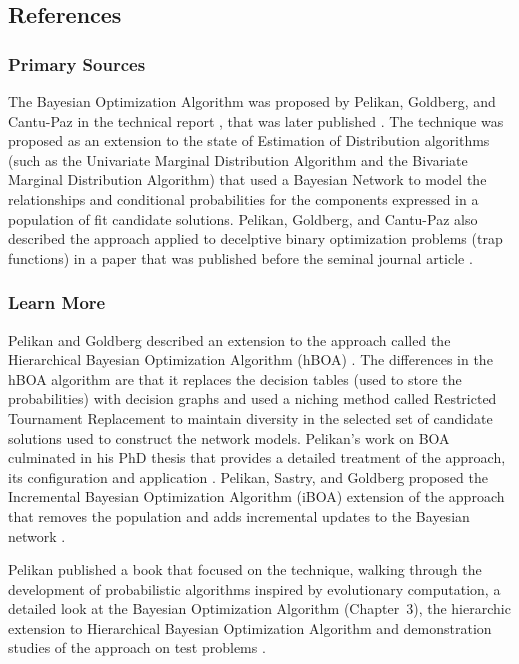 \subsection{References}

% 
% 
\subsubsection{Primary Sources}
The Bayesian Optimization Algorithm was proposed by Pelikan, Goldberg, and Cantu-Paz in the technical report \cite{Pelikan1998a}, that was later published \cite{Pelikan2002}. The technique was proposed as an extension to the state of Estimation of Distribution algorithms (such as the Univariate Marginal Distribution Algorithm and the Bivariate Marginal Distribution Algorithm) that used a Bayesian Network to model the relationships and conditional probabilities for the components expressed in a population of fit candidate solutions.
Pelikan, Goldberg, and Cantu-Paz also described the approach applied to decelptive binary optimization problems (trap functions) in a paper that was published before the seminal journal article \cite{Pelikan1999a}.

% 
% 
\subsubsection{Learn More}
Pelikan and Goldberg described an extension to the approach called the Hierarchical Bayesian Optimization Algorithm (hBOA) \cite{Pelikan2000, Pelikan2001b}. The differences in the hBOA algorithm are that it replaces the decision tables (used to store the probabilities) with decision graphs and used a niching method called Restricted Tournament Replacement to maintain diversity in the selected set of candidate solutions used to construct the network models.
Pelikan's work on BOA culminated in his PhD thesis that provides a detailed treatment of the approach, its configuration and application \cite{Pelikan2002a}.
Pelikan, Sastry, and Goldberg proposed the Incremental Bayesian Optimization Algorithm (iBOA) extension of the approach that removes the population and adds incremental updates to the Bayesian network \cite{Pelikan2008}.

Pelikan published a book that focused on the technique, walking through the development of probabilistic algorithms inspired by evolutionary computation, a detailed look at the Bayesian Optimization Algorithm (Chapter~3), the hierarchic extension to Hierarchical Bayesian Optimization Algorithm and demonstration studies of the approach on test problems \cite{Pelikan2005}.


